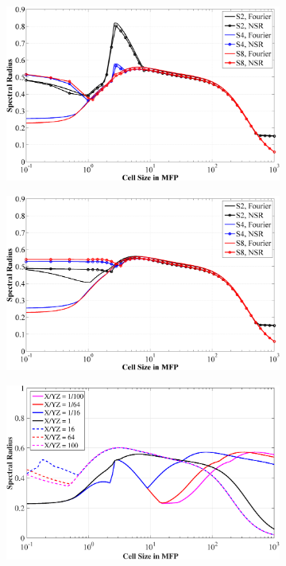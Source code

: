 \documentclass[11pt]{article}
\begin{document}
\begin{figure}
\centering
	\begin{subfigure}[b]{0.48\textwidth}
		\centering
		\includegraphics[width=\textwidth]{figures/SI_MIP_hex_C=1_LS2,4,8_F&NSR_PDT.png}
	\end{subfigure}
	\hfill
	\begin{subfigure}[b]{0.48\textwidth}
		\centering
		\includegraphics[width=\textwidth]{figures/SI_MIP_hex_C=4_LS2,4,8_F&NSR_PDT.png}
	\end{subfigure}
	\vfill
	\begin{subfigure}[b]{0.48\textwidth}
		\centering
		\includegraphics[width=\textwidth]{figures/SI_MIP_hex_LS8_C=1_AR.eps}

\end{subfigure}
\end{figure}
\end{document}
